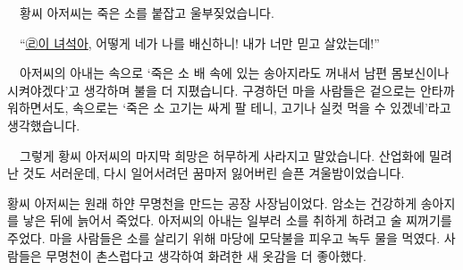 \documentclass[fs95,seriesFre]{korfarm-base}
\begin{document}
{　황씨 아저씨는 죽은 소를 붙잡고 울부짖었습니다.

　“\uline{㉣이 녀석아}, 어떻게 네가 나를 배신하니! 내가 너만 믿고 살았는데!”

　아저씨의 아내는 속으로 ‘죽은 소 배 속에 있는 송아지라도 꺼내서 남편 몸보신이나 시켜야겠다’고 생각하며 불을 더 지폈습니다. 구경하던 마을 사람들은 겉으로는 안타까워하면서도, 속으로는 ‘죽은 소 고기는 싸게 팔 테니, 고기나 실컷 먹을 수 있겠네’라고 생각했습니다.

　그렇게 황씨 아저씨의 마지막 희망은 허무하게 사라지고 말았습니다. 산업화에 밀려난 것도 서러운데, 다시 일어서려던 꿈마저 잃어버린 슬픈 겨울밤이었습니다.
}


\kfActivityBg \par{}\par\nopagebreak[4]\smallskip\nopagebreak[4]
\begin{kfOXList}
\kfOXItem 황씨 아저씨는 원래 하얀 무명천을 만드는 공장 사장님이었다. \kfOX
\kfOXItem 암소는 건강하게 송아지를 낳은 뒤에 늙어서 죽었다. \kfOX
\kfOXItem 아저씨의 아내는 일부러 소를 취하게 하려고 술 찌꺼기를 주었다. \kfOX
\kfOXItem 마을 사람들은 소를 살리기 위해 마당에 모닥불을 피우고 녹두 물을 먹였다. \kfOX
\kfOXItem 사람들은 무명천이 촌스럽다고 생각하여 화려한 새 옷감을 더 좋아했다. \kfOX
\end{kfOXList}

\kfActivityBg \par{}\par\nopagebreak[4]\smallskip\nopagebreak[4]

\end{document}
